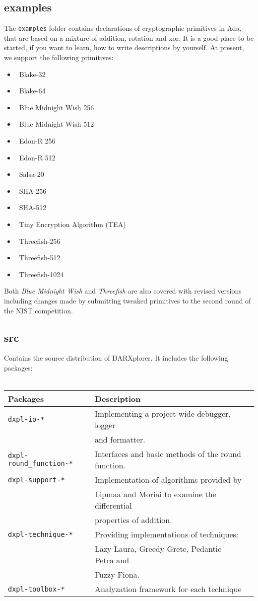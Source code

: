 \documentclass{acmtrans2m}
\begin{document}
\subsection{examples}
The \texttt{examples} folder contains declarations of cryptographic primitives in Ada, that are based on a mixture of addition, rotation and xor. It is a good place to be started, if you want to learn, how to write descriptions by yourself. At present, we support the following primitives:
\begin{itemize}
	\item \ Blake-32
	\item \ Blake-64
	\item \ Blue Midnight Wish 256
	\item \ Blue Midnight Wish 512
	\item \ Edon-R 256
	\item \ Edon-R 512
	\item \ Salsa-20
	\item \ SHA-256
	\item \ SHA-512
	\item \ Tiny Encryption Algorithm (TEA)
	\item \ Threefish-256
	\item \ Threefish-512
	\item \ Threefish-1024
\end{itemize}

Both \textit{Blue Midnight Wish} and \textit{Threefish} are also covered with revised versions including changes made by submitting tweaked primitives to the second round of the NIST competition.

\subsection{src}
Contains the source distribution of DARXplorer. It includes the following packages:\\ \\
\medskip
\begin{tabular}{l l l}
        Packages & Description\\
\hline
        \verb|dxpl-io-*| & Implementing a project wide debugger, logger\\
        & and formatter.\\
        \verb|dxpl-round_function-*| & Interfaces and basic methods of the round function.\\
        \verb|dxpl-support-*| & Implementation of algorithms provided by\\
        &  Lipmaa and Moriai to examine the differential\\
        &  properties of addition.\\
        \verb|dxpl-technique-*| & Providing implementations of techniques: \\
        & Lazy Laura, Greedy Grete, Pedantic Petra and\\
        & Fuzzy Fiona.\\
        \verb|dxpl-toolbox-*| & Analyzation framework for each technique\\
\end{tabular}
\end{document}
